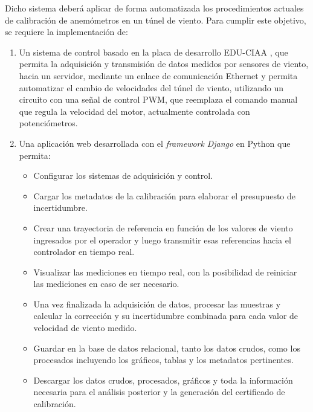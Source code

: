 Dicho sistema deberá aplicar de forma automatizada los procedimientos actuales de calibración de anemómetros en un túnel de viento. Para cumplir este objetivo, se requiere la implementación de:
\begin{enumerate}
    \item Un sistema de control basado en la placa de desarrollo EDU-CIAA \cite{proyectoCIAA}, que permita la adquisición y transmisión de datos medidos por sensores de viento, hacia un servidor, mediante un enlace de comunicación Ethernet y permita automatizar el cambio de velocidades del túnel de viento, utilizando un circuito con una señal de control PWM, que reemplaza el comando manual que regula la velocidad del motor, actualmente controlada con potenciómetros.
     
    \item Una aplicación web desarrollada con el \textit{framework} \textit{Django} en Python que permita:
    \begin{itemize}
        \item Configurar los sistemas de adquisición y control.
        \item Cargar los metadatos de la calibración para elaborar el presupuesto de incertidumbre.
        \item Crear una trayectoria de referencia en función de los valores de viento ingresados por el operador y luego transmitir esas referencias hacia el controlador en tiempo real.
        \item Visualizar las mediciones en tiempo real, con la posibilidad de reiniciar las mediciones en caso de ser necesario.
        \item Una vez finalizada la adquisición de datos, procesar las muestras y calcular la corrección y su incertidumbre combinada para cada valor de velocidad de viento medido.
        \item Guardar en la base de datos relacional, tanto los datos crudos, como los procesados incluyendo los gráficos, tablas y los metadatos pertinentes.
        \item Descargar los datos crudos, procesados, gráficos y toda la información necesaria para el análisis posterior y la generación del certificado de calibración.
    \end{itemize}
\end{enumerate}

